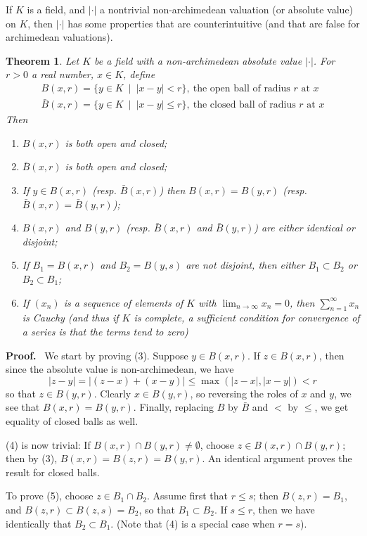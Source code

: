 \documentclass[12pt]{article}
\newtheorem{thm}{Theorem}
\newcommand{\Abs}[1]{\left\lvert #1\right\rvert}
\begin{document}
If $K$ is a field, and $\Abs{\cdot}$ a nontrivial non-archimedean valuation (or absolute value) on $K$, then $\Abs{\cdot}$ has some properties that are counterintuitive (and that are false for archimedean valuations).
\begin{thm}
Let $K$ be a field with a non-archimedean absolute value $\Abs{\cdot}$. For $r>0$ a real number, $x\in K$, define
\begin{gather*}
B(x,r) = \{y\in K\ \mid\ \Abs{x-y}<r\},\ \text{the open ball of radius $r$ at $x$}\\
\bar{B}(x,r) = \{y\in K\ \mid\ \Abs{x-y}\leq r\},\ \text{the closed ball of radius $r$ at $x$}
\end{gather*}
Then
\begin{enumerate}
\item $B(x,r)$ is both open and closed;
\item $\bar{B}(x,r)$ is both open and closed;
\item If $y\in B(x,r)$ (resp. $\bar{B}(x,r)$) then $B(x,r)=B(y,r)$ (resp. $\bar{B}(x,r)=\bar{B}(y,r)$);
\item $B(x,r)$ and $B(y,r)$ (resp. $\bar{B}(x,r)$ and $\bar{B}(y,r)$) are either identical or disjoint;
\item If $B_1 = B(x,r)$ and $B_2 = B(y,s)$ are not disjoint, then either $B_1\subset B_2$ or $B_2\subset B_1$;
\item If $(x_n)$ is a sequence of elements of $K$ with $\lim_{n\to\infty} x_n=0$, then $\sum_{n=1}^{\infty} x_n$ is Cauchy (and thus if $K$ is complete, a sufficient condition for convergence of a series is that the terms tend to zero)
\end{enumerate}
\end{thm}

\textbf{Proof. }\ We start by proving (3). Suppose $y\in B(x,r)$. If $z\in B(x,r)$, then since the absolute value is non-archimedean, we have
\[\Abs{z-y} =\Abs{(z-x)+(x-y)} \leq \max(\Abs{z-x},\Abs{x-y}) < r\]
so that $z\in B(y,r)$. Clearly $x\in B(y,r)$, so reversing the roles of $x$ and $y$, we see that $B(x,r) = B(y,r)$. Finally, replacing $B$ by $\bar{B}$ and $<$ by $\leq$, we get equality of closed balls as well.

(4) is now trivial: If $B(x,r)\cap B(y,r)\neq\emptyset$, choose $z\in B(x,r)\cap B(y,r)$; then by (3), $B(x,r) = B(z,r) = B(y,r)$. An identical argument proves the result for closed balls.

To prove (5), choose $z\in B_1\cap B_2$. Assume first that $r\leq s$; then $B(z,r) = B_1$, and $B(z,r)\subset B(z,s) = B_2$, so that $B_1\subset B_2$. If $s\leq r$, then we have identically that $B_2\subset B_1$. (Note that (4) is a special case when $r=s$).
\end{document}
